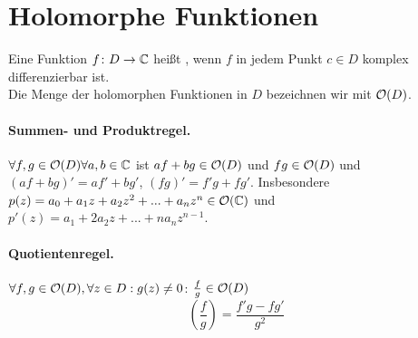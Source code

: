 \section{Holomorphe Funktionen}
\begin{definition}
	Eine Funktion $ f\colon D\rightarrow\mathbb{C} $ hei\ss t , wenn $ f $ in jedem Punkt $ c\in D $ komplex differenzierbar ist.\\
	Die Menge der holomorphen Funktionen in $ D $ bezeichnen wir mit $ \mathcal O(D) $.
\end{definition}
\paragraph{Summen- und Produktregel.} $ \forall f,g\in\mathcal O(D) \forall a,b\in\mathbb{C}$ ist $ af+bg \in\mathcal O(D) $ und $ fg\in\mathcal O(D) $ und $ (af+bg)'=af'+bg' $, $ (fg)'=f'g+fg' $. Insbesondere $ p(z)=a_0+a_1z+a_2z^2+...+a_nz^n\in\mathcal O(\mathbb{C}) $ und $ p'(z)=a_1+2a_2z+...+na_nz^{n-1} $.
\paragraph{Quotientenregel.} $ \forall f,g\in\mathcal O(D), \forall z\in D: g(z)\neq 0 $: $\frac{f}{g}\in\mathcal O(D)$
\[ \left(\frac{f}{g}\right)=\frac{f'g-fg'}{g^2} \]
